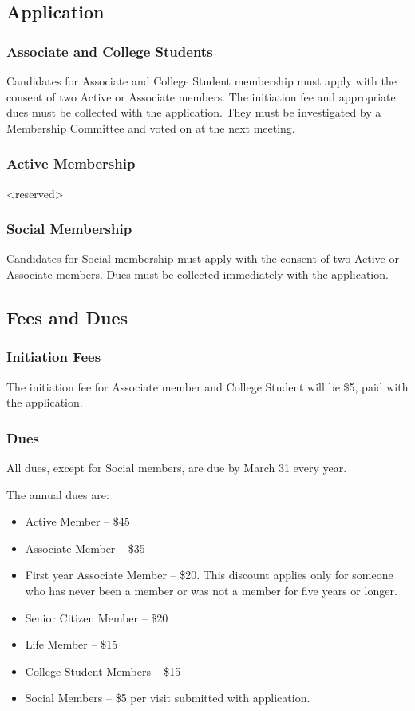 \documentclass[12pt,letterpaper]{article}
\begin{document}
\subsection{Application}

\subsubsection{Associate and College Students}
Candidates for Associate and College Student membership must apply with the consent of two Active or Associate members. The initiation fee and appropriate dues must be collected with the application. They must be investigated by a Membership Committee and voted on at the next meeting.

\subsubsection{Active Membership}
{\textless}reserved{\textgreater}

\subsubsection{Social Membership}
Candidates for Social membership must apply with the consent of two Active or Associate members. Dues must be collected immediately with the application.

\subsection{Fees and Dues}

\subsubsection{Initiation Fees}
The initiation fee for Associate member and College Student will be \$5, paid with the application.

\subsubsection{Dues}
All dues, except for Social members, are due by March 31 every year. 

The annual dues are:
\begin{itemize}
\item Active Member -- \$45
\item Associate Member -- \$35
\item First year Associate Member -- \$20. This discount applies only for someone who has never been a member or was not
a member for five years or longer.
\item Senior Citizen Member -- \$20
\item Life Member -- \$15
\item College Student Members -- \$15
\item Social Members -- \$5 per visit submitted with application.
\end{itemize}
\end{document}
